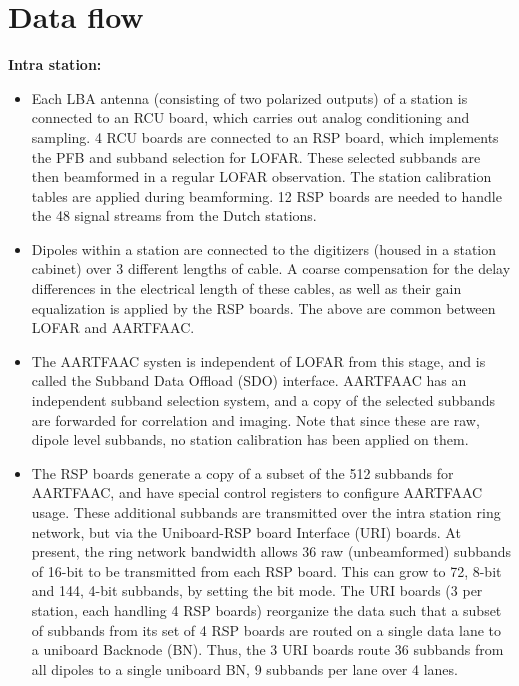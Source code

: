 \documentclass {article}
\begin{document}
\section {Data flow}
\textbf {Intra  station:}
\begin {itemize} 
  \item Each LBA antenna (consisting of two polarized outputs) of a station is
    connected  to an  RCU board,  which  carries out  analog conditioning  and
    sampling.  4  RCU boards are connected  to an RSP board,  which implements
    the PFB and subband selection for LOFAR.  These selected subbands are then
    beamformed in a regular LOFAR observation.  The station calibration tables
    are applied during beamforming. 12 RSP  boards are needed to handle the 48
    signal streams from the Dutch stations.

  \item Dipoles within a station are  connected to the digitizers (housed in a
    station cabinet) over 3 different  lengths of cable. A coarse compensation
    for the  delay differences in  the electrical  length of these  cables, as
    well as  their gain equalization is  applied by the RSP  boards. The above
    are common between LOFAR and AARTFAAC.

  \item The  AARTFAAC systen is independent  of LOFAR from this  stage, and is
    called  the  Subband  Data  Offload  (SDO)  interface.   AARTFAAC  has  an
    independent subband selection system, and  a copy of the selected subbands
    are forwarded for correlation and imaging.  Note that since these are raw,
    dipole level subbands, no station calibration has been applied on them.

  \item The  RSP boards generate a  copy of a  subset of the 512  subbands for
    AARTFAAC, and have special control  registers to configure AARTFAAC usage.
    These  additional subbands  are transmitted  over the  intra station  ring
    network,  but  via the  Uniboard-RSP  board  Interface (URI)  boards.   At
    present, the ring network bandwidth  allows 36 raw (unbeamformed) subbands
    of 16-bit  to be  transmitted from each  RSP board. This  can grow  to 72,
    8-bit and 144, 4-bit subbands, by setting  the bit mode. The URI boards (3
    per station, each  handling 4 RSP boards) reorganize the  data such that a
    subset of  subbands from its set  of 4 RSP  boards are routed on  a single
    data lane to  a uniboard Backnode (BN).   Thus, the 3 URI  boards route 36
    subbands from  all dipoles to  a single uniboard  BN, 9 subbands  per lane
    over 4 lanes.


\end{itemize}
\end{document}
